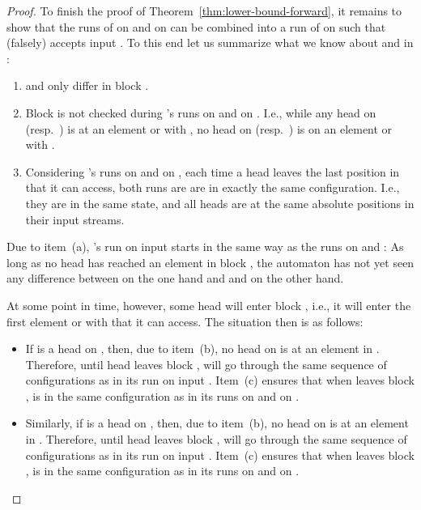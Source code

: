 \documentclass[proceedings]{stacs}
\theoremstyle{plain}\newtheorem{satz}[thm]{Satz}
\theoremstyle{definition}\newtheorem{crucial}[thm]{Crucial Definition}
\newenvironment{mi}{\begin{itemize}}{\end{itemize}}
\newenvironment{mea}{\begin{enumerate}[\mbox{\quad }(a)]}{\end{enumerate}}
\begin{document}
\begin{proof}
To finish the proof of Theorem~\ref{thm:lower-bound-forward}, it remains to show that
the runs of  on  and on  
can be combined into a run of  on  such that  (falsely) accepts
input . To this end let us summarize what we know about  and  in 
: \vspace{1ex}

\begin{mea}
 \item  and  only differ in block .
  \vspace{1ex}
 \item Block  is not checked during 's runs on  and 
   on . I.e., while any head on  (resp.\ ) is
   at an element  or  with , no head on 
   (resp.\ ) is on an element  or  with .
  \vspace{1ex}
 \item Considering 's runs on  and on , each
  time a head leaves the last position in  that it can access, both runs are 
  are in exactly the same configuration. I.e., they are in the same state, and all
  heads are at the same absolute positions in their input streams.
  \vspace{1ex}
\end{mea}

\noindent
Due to item~(a),
's run on input  starts in the same way as the runs on
 and : As long as no head has reached an element in
block , the automaton has not yet seen any difference between  on
the one hand and  and  on the other hand.

At some point in time, however, some head  will enter block , 
i.e., it will enter the first element  or  with  that 
it can access.
The situation then is as follows: \vspace{1ex}
\begin{mi}
 \item 
   If  is a head on , then, due to item~(b), no head on 
    is at an element in . 
   Therefore, until head  leaves block ,  will go through the 
   same sequence of configurations as in its run on input . 
   Item~(c) ensures that when  leaves block ,  is in the same configuration
   as in its runs on  and on .
  \vspace{1ex}
 \item
   Similarly, if  is a head on , then, due to item~(b), no head on 
    is at an element in . 
   Therefore, until head  leaves block ,  will go through the 
   same sequence of configurations as in its run on input . 
   Item~(c) ensures that when  leaves block ,  is in the same configuration
   as in its runs on  and on .
  \vspace{1ex}
\end{mi}


\end{proof}
\end{document}
